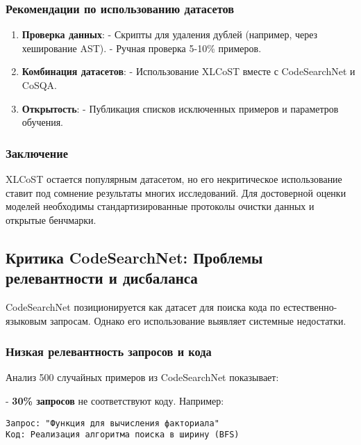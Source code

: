 \documentclass[14pt]{article}
\theoremstyle{definition}
\begin{document}
\subsubsection{Рекомендации по использованию датасетов}

\begin{enumerate}
    \item \textbf{Проверка данных}:  
      - Скрипты для удаления дублей (например, через хеширование AST).  
      - Ручная проверка 5-10\% примеров.
    \item \textbf{Комбинация датасетов}:  
      - Использование XLCoST вместе с CodeSearchNet и CoSQA.
    \item \textbf{Открытость}:  
      - Публикация списков исключенных примеров и параметров обучения.
\end{enumerate}

\subsubsection{Заключение}

XLCoST остается популярным датасетом, но его некритическое использование ставит под сомнение результаты многих исследований. Для достоверной оценки моделей необходимы стандартизированные протоколы очистки данных и открытые бенчмарки.


\newpage

\subsection{Критика CodeSearchNet: Проблемы релевантности и дисбаланса}

CodeSearchNet \cite{codesearchnet} позиционируется как датасет для поиска кода по естественно-языковым запросам. Однако его использование выявляет системные недостатки.

\subsubsection{Низкая релевантность запросов и кода}

Анализ 500 случайных примеров из CodeSearchNet \cite{codesearchnet_repo} показывает:

    
- \textbf{30\% запросов} не соответствуют коду. Например:
    \begin{verbatim}
Запрос: "Функция для вычисления факториала"
Код: Реализация алгоритма поиска в ширину (BFS)
    \end{verbatim}
    
\end{document}

